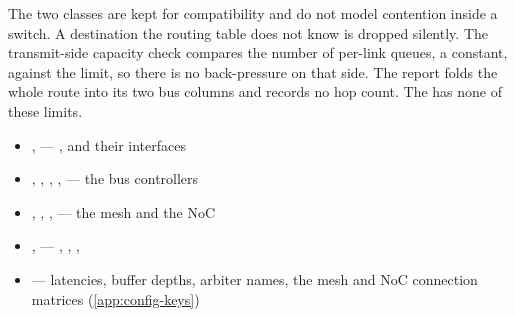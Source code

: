 \begin{notebox}
The two classes are kept for compatibility and do not model contention inside a switch. A
destination the  routing table does not know is dropped silently. The transmit-side
capacity check compares the number of per-link queues, a constant, against the limit, so there is
no back-pressure on that side. The report folds the whole route into its two bus columns and records
no hop count. The  has none of these limits.
\end{notebox}

\begin{wherebox}
\begin{itemize}[nosep,leftmargin=1.2em]
\item {},  --- ,  and their interfaces
\item {}, , , ,  --- the bus controllers
\item {}, , ,  --- the mesh and the NoC
\item {},  --- , , , 
\item {} --- latencies, buffer depths, arbiter names, the mesh and NoC connection matrices (\cref{app:config-keys})
\end{itemize}
\end{wherebox}
